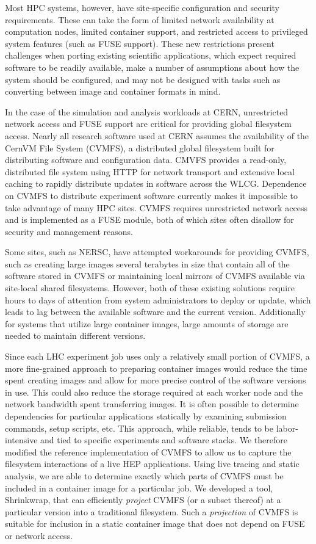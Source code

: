 \documentclass[sigconf]{acmart}
\begin{document}
Most HPC systems, however, have site-specific configuration and security requirements.
These can take the form of limited network availability at computation nodes,
limited container support,
and restricted access to privileged system features (such as FUSE support).
These new restrictions present challenges when porting existing scientific applications,
which expect required software to be readily available,
make a number of assumptions about how the system should be configured,
and may not be designed with tasks such as converting between image and container formats in mind.

In the case of the simulation and analysis workloads at CERN,
unrestricted network access and FUSE support are critical for providing global filesystem access.
Nearly all research software used at CERN assumes the availability of the CernVM File System (CVMFS),
a distributed global filesystem built for distributing software and configuration data.
CMVFS provides a read-only, distributed file system using HTTP for network transport and extensive local
caching to rapidly distribute updates in software across the WLCG.
Dependence on CVMFS to distribute experiment software currently makes it impossible to take advantage of many HPC sites.
CVMFS requires unrestricted network access and is implemented as a FUSE module,
both of which sites often disallow for security and management reasons.

Some sites, such as NERSC,
have attempted workarounds for providing CVMFS,
such as creating large images several terabytes in size that contain all of the software stored in CVMFS or
maintaining local mirrors of CVMFS available via site-local shared filesystems.
However, both of these existing solutions require 
hours to days of attention from system administrators to deploy or update,
which leads to lag between the available software and the current version.
Additionally for systems that utilize large container images, large amounts of storage are needed to maintain different versions.

Since each LHC experiment job uses 
only a relatively small portion of CVMFS,
a more fine-grained approach to preparing container images would reduce the time spent creating images and allow for more precise control of the software versions in use.
This could also reduce the storage required at each worker node and the network bandwidth spent transferring images.
It is often possible to determine dependencies for particular applications statically by examining submission commands, setup scripts, etc.
This approach, while reliable, tends to be labor-intensive and tied to specific experiments and software stacks.
We therefore modified the reference implementation of CVMFS to allow us to capture the filesystem interactions of a live HEP applications.
Using live tracing and static analysis,
we are able to determine exactly which parts of CVMFS must be included in a container image for a particular job.
We developed a tool, Shrinkwrap, that can efficiently \emph{project} CVMFS (or a subset thereof) at a particular version into a traditional filesystem.
Such a \emph{projection} of CVMFS is suitable for inclusion in a static container image that does not depend on FUSE or network access.
\end{document}
